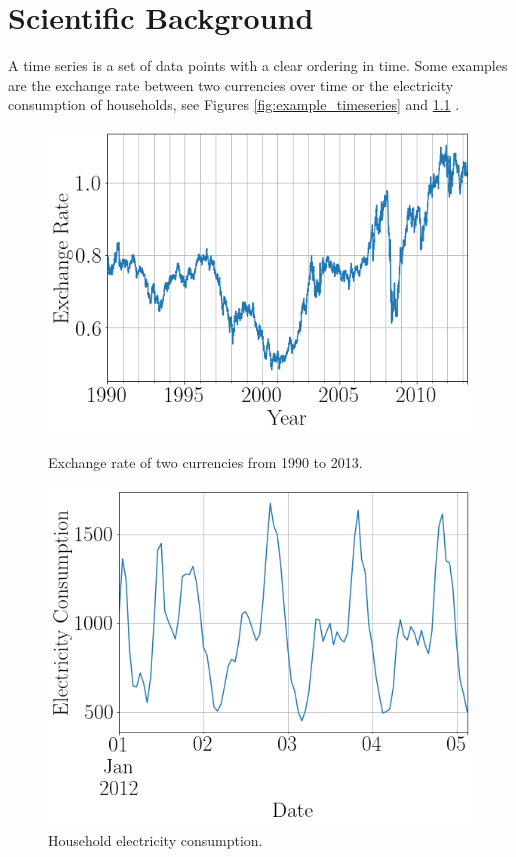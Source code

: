 \chapter{Scientific Background}
\label{cha:chapter2}

A time series is a set of data points with a clear ordering in time. Some examples are the exchange rate between two currencies over time or the electricity consumption of households, see Figures \ref{fig:example_timeseries} and \ref{fig:example_timeseries_electricity} \cite{gluonts_paper}.

\begin{figure}[htb]
  \centering
  \includegraphics[width=\linewidth]{./img/exchange_rate_zoomed_2.png}
  \caption{Exchange rate of two currencies from 1990 to 2013.}
  \label{fig:example_timeseries}
  \endminipage\hfill
  \includegraphics[width=\linewidth]{./img/electricity_zoomed_3.png}
  \caption{Household electricity consumption.}
  \label{fig:example_timeseries_electricity}
  \endminipage\hfill
\end{figure}

